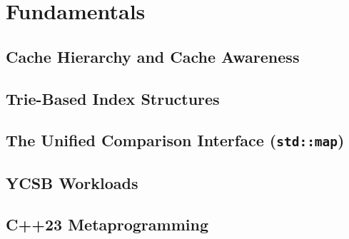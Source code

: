 \chapter{Fundamentals}\label{ch:fundamentals}


\section{Cache Hierarchy and Cache Awareness}\label{sec:cache-basics}

\section{Trie-Based Index Structures}\label{sec:trie-basics}

\section{The Unified Comparison Interface (\texorpdfstring{\texttt{std::map}}{std::map})}\label{sec:stdmap-interface}

\section{YCSB Workloads}\label{sec:ycsb}

\section{C++23 Metaprogramming}\label{sec:cpp23}
